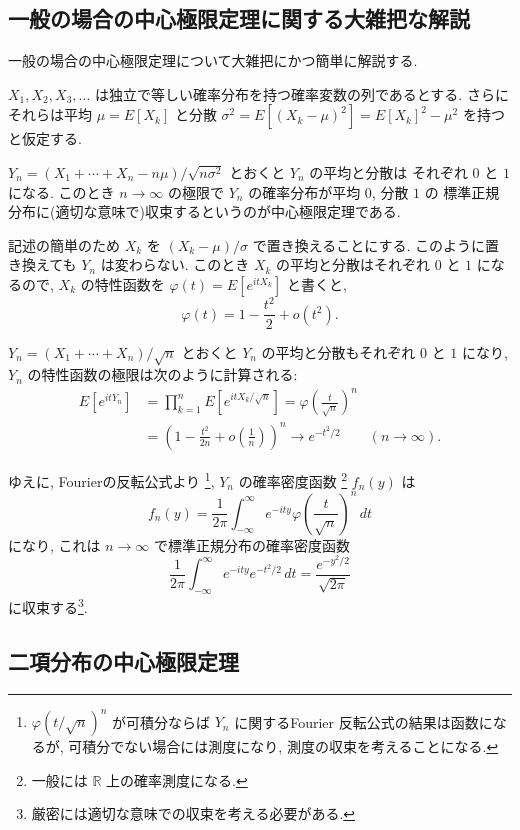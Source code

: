 \documentclass[12pt,twoside]{jarticle}
\newcommand\R{{\mathbb R}} %
\theoremstyle{jplain}
\theoremstyle{jplain}
\theoremstyle{jplain}
\numberwithin{theorem}{section}
\numberwithin{equation}{section}
\numberwithin{figure}{section}
\numberwithin{table}{section}
\begin{document}

\subsection{一般の場合の中心極限定理に関する大雑把な解説}

一般の場合の中心極限定理について大雑把にかつ簡単に解説する.

$X_1,X_2,X_3,\ldots$ は独立で等しい確率分布を持つ確率変数の列であるとする.
さらにそれらは平均 $\mu=E[X_k]$ と分散 $\sigma^2=E[(X_k-\mu)^2]=E[X_k]^2-\mu^2$
を持つと仮定する. 

$Y_n=(X_1+\cdots+X_n-n\mu)/\sqrt{n\sigma^2}$ とおくと $Y_n$ の平均と分散は
それぞれ $0$ と $1$ になる.
このとき $n\to\infty$ の極限で $Y_n$ の確率分布が平均 $0$, 分散 $1$ の
標準正規分布に(適切な意味で)収束するというのが中心極限定理である.

記述の簡単のため $X_k$ を $(X_k-\mu)/\sigma$ で置き換えることにする. 
このように置き換えても $Y_n$ は変わらない.
このとき $X_k$ の平均と分散はそれぞれ $0$ と $1$ になるので, 
$X_k$ の特性函数を $\varphi(t)=E[e^{itX_k}]$ と書くと,
\[
\varphi(t) = 1 - \frac{t^2}{2} + o(t^2).
\]

$Y_n=(X_1+\cdots+X_n)/\sqrt{n}$ とおくと 
$Y_n$ の平均と分散もそれぞれ $0$ と $1$ になり, 
$Y_n$ の特性函数の極限は次のように計算される:
\begin{align*}
E[e^{itY_n}]
&=\prod_{k=1}^n E[e^{itX_k/\sqrt{n}}]
=\varphi\left(\frac{t}{\sqrt{n}}\right)^n
\\ &
=\left( 1 - \frac{t^2}{2n} + o\left(\frac{1}{n}\right) \right)^n
\longrightarrow e^{-t^2/2}
\qquad (n\to\infty).
\end{align*}

ゆえに, Fourierの反転公式より%
\footnote{$\varphi(t/\sqrt{n})^n$ が可積分ならば 
$Y_n$ に関するFourier 反転公式の結果は函数になるが, 
可積分でない場合には測度になり, 測度の収束を考えることになる.}, 
$Y_n$ の確率密度函数%
\footnote{一般には $\R$ 上の確率測度になる.}
$f_n(y)$ は
\[
f_n(y) 
= \frac{1}{2\pi}\int_{-\infty}^\infty 
  e^{-ity}\varphi\left(\frac{t}{\sqrt{n}}\right)^n\,dt
\]
になり, これは $n\to\infty$ で標準正規分布の確率密度函数
\[
\frac{1}{2\pi}\int_{-\infty}^\infty e^{-ity}e^{-t^2/2}\,dt
=\frac{e^{-y^2/2}}{\sqrt{2\pi}}
\]
に収束する\footnote{厳密には適切な意味での収束を考える必要がある.}.


\subsection{二項分布の中心極限定理}
\end{document}
